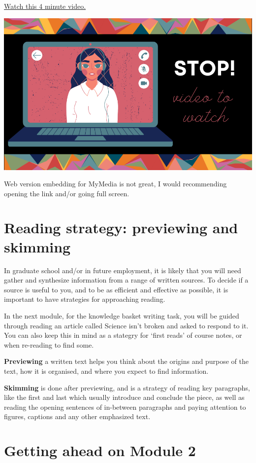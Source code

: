 \documentclass[
  openany]{book}
\begin{document}
\href{https://play.library.utoronto.ca/f395cfcc26b4009cbc28c1aa9a86096c}{Watch this 4 minute video.}

\begin{center}\includegraphics[width=0.6\linewidth]{images/stop-video} \end{center}

Web version embedding for MyMedia is not great, I would recommending opening the link and/or going full screen.

\hypertarget{previewskim}{%
\section{Reading strategy: previewing and skimming}\label{previewskim}}

In graduate school and/or in future employment, it is likely that you will need gather and synthesize information from a range of written sources. To decide if a source is useful to you, and to be as efficient and effective as possible, it is important to have strategies for approaching reading.

In the next module, for the knowledge basket writing task, you will be guided through reading an article called Science isn't broken and asked to respond to it. You can also keep this in mind as a stategry for `first reads' of course notes, or when re-reading to find some.

\textbf{Previewing} a written text helps you think about the origins and purpose of the text, how it is organised, and where you expect to find information.

\textbf{Skimming} is done after previewing, and is a strategy of reading key paragraphs, like the first and last which usually introduce and conclude the piece, as well as reading the opening sentences of in-between paragraphs and paying attention to figures, captions and any other emphasized text.

\hypertarget{getting-ahead-on-module-2}{%
\section{Getting ahead on Module 2}\label{getting-ahead-on-module-2}}
\end{document}
